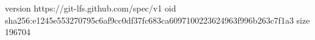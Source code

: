 version https://git-lfs.github.com/spec/v1
oid sha256:e1245e553270795c6af9cc0df37fc683ca6097100223624963f996b263c7f1a3
size 196704
